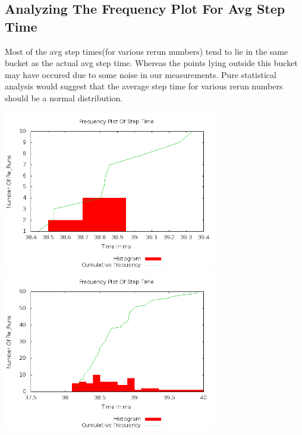 \documentclass[11pt]{article}
\begin{document}
	\subsection{Analyzing The Frequency Plot For Avg Step Time}
	Most of the avg step times(for various rerun numbers) tend to lie in the same bucket as the actual avg step time. Whereas the points lying outside this bucket may have occured due to some noise in our measurements. Pure statistical analysis would suggest that the average step time for various rerun numbers should be a normal distribution.
	
	\begin{center}\includegraphics[height=7cm]{10_10_plot04.png}\includegraphics[height=7cm]{30_60_plot04.png}\end{center}
\end{document}
